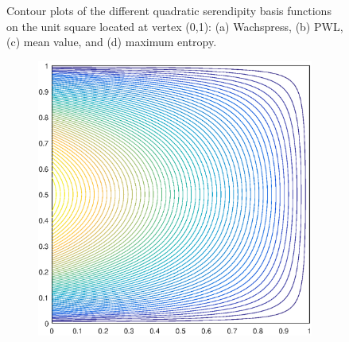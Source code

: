 \documentclass[11pt]{article}
\begin{document}
\begin{figure}
\begin{subfigure}[b]{0.25\textwidth}
		\caption{}
	\end{subfigure}
\caption{Contour plots of the different quadratic serendipity basis functions on the unit square located at vertex (0,1): (a) Wachspress, (b) PWL, (c) mean value, and (d) maximum entropy.}
\label{fig::2D_Quadratic_Summary_unit_square_basis_functions_b4}
\end{figure}

\begin{figure}
\centering
	\begin{subfigure}[b]{0.25\textwidth}
		\centering
		\includegraphics[width=\textwidth]{figures/square_WACHSPRESS2_contour_b8.eps}
		\caption{}
	\end{subfigure}
	\hspace{1cm}
	\begin{subfigure}[b]{0.25\textwidth}
		\centering

\end{subfigure}
\end{figure}
\end{document}
